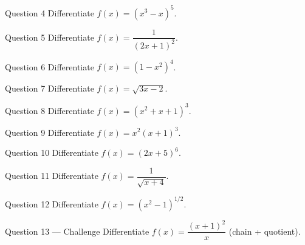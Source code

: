 \documentclass[11pt]{article}
\begin{document}
\begin{qbox}{Question 4}
Differentiate $f(x)=(x^3-x)^5$.\workspace{2.4cm}
\end{qbox}

\begin{qbox}{Question 5}
Differentiate $f(x)=\dfrac1{(2x+1)^2}$.\workspace{2.4cm}
\end{qbox}

\begin{qbox}{Question 6}
Differentiate $f(x)=(1-x^2)^4$.\workspace{2.4cm}
\end{qbox}

\begin{qbox}{Question 7}
Differentiate $f(x)=\sqrt{3x-2}$.\workspace{2.4cm}
\end{qbox}

\begin{qbox}{Question 8}
Differentiate $f(x)=(x^2+x+1)^3$.\workspace{2.4cm}
\end{qbox}

\begin{qbox}{Question 9}
Differentiate $f(x)=x^2(x+1)^3$.\workspace{2.4cm}
\end{qbox}

\begin{qbox}{Question 10}
Differentiate $f(x)=(2x+5)^6$.\workspace{2.4cm}
\end{qbox}

\begin{qbox}{Question 11}
Differentiate $f(x)=\dfrac{1}{\sqrt{x+4}}$.\workspace{2.4cm}
\end{qbox}

\begin{qbox}{Question 12}
Differentiate $f(x)=(x^2-1)^{1/2}$.\workspace{2.4cm}
\end{qbox}

\begin{qbox}{Question 13 --- Challenge}
Differentiate $f(x)=\dfrac{(x+1)^2}{x}$ (chain + quotient).\workspace{3cm}
\end{qbox}

\clearpage
{}
\end{document}
